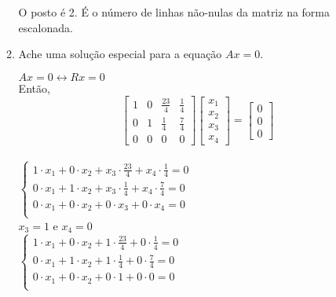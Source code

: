 \documentclass[leqno]{article}
\numberwithin{equation}{section}
\begin{document}
\begin{enumerate}
\begin{enumerate}
			\begin{sol} 
				O posto é 2. É o número de linhas não-nulas da matriz na forma escalonada.  
			\end{sol} 
			
			\item Ache uma solução especial para a equação $Ax = 0$.
			
			\begin{sol} 
				$Ax = 0 \longleftrightarrow Rx = 0$\\
				Então, $$\begin{bmatrix} 
					1 & 0 & \frac{23}{4} & \frac{1}{4}\\
					0 & 1 & \frac{1}{4} & \frac{7}{4} \\
					0 & 0 & 0 & 0
				\end{bmatrix}\begin{bmatrix} 
					x_1 \\
					x_2 \\
					x_3 \\
					x_4 \end{bmatrix} = 
					\begin{bmatrix} 
					0 \\
					0 \\
					0 \end{bmatrix}$$ \\
				$
				\left\{
				\begin {array}{cl}
				1 \cdot x_1 + 0 \cdot x_2 + x_3 \cdot \frac{23}{4} + x_4 \cdot \frac{1}{4} = 0\\
				0 \cdot x_1 + 1 \cdot x_2 + x_3 \cdot \frac{1}{4} + x_4 \cdot \frac{7}{4} = 0\\
				0 \cdot x_1 + 0 \cdot x_2 + 0 \cdot x_3 + 0 \cdot x_4 = 0\\
				\end{array}
				\right.$\\
				\newline
				$x_3 = 1$ e $x_4 = 0$\\
				\newline
				$
				\left\{
				\begin {array}{cl}
				1 \cdot x_1 + 0 \cdot x_2 + 1 \cdot \frac{23}{4} + 0 \cdot \frac{1}{4} = 0\\
				0 \cdot x_1 + 1 \cdot x_2 + 1 \cdot \frac{1}{4} + 0 \cdot \frac{7}{4} = 0\\
				0 \cdot x_1 + 0 \cdot x_2 + 0 \cdot 1 + 0 \cdot 0 = 0\\
				\end{array}
				\right.$\\

\end{sol}
\end{enumerate}
\end{enumerate}
\end{document}
